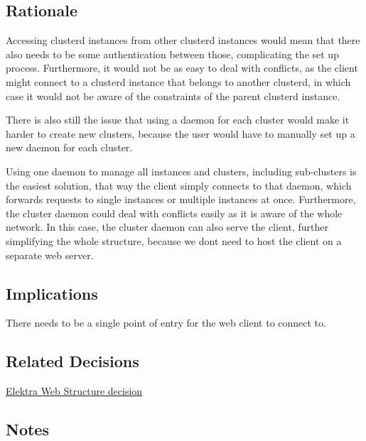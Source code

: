 \subsection*{Rationale}

Accessing clusterd instances from other clusterd instances would mean that there also needs to be some authentication between those, complicating the set up process. Furthermore, it would not be as easy to deal with conflicts, as the client might connect to a clusterd instance that belongs to another clusterd, in which case it would not be aware of the constraints of the parent clusterd instance.

There is also still the issue that using a daemon for each cluster would make it harder to create new clusters, because the user would have to manually set up a new daemon for each cluster.

Using one daemon to manage all instances and clusters, including sub-\/clusters is the easiest solution, that way the client simply connects to that daemon, which forwards requests to single instances or multiple instances at once. Furthermore, the cluster daemon could deal with conflicts easily as it is aware of the whole network. In this case, the cluster daemon can also serve the client, further simplifying the whole structure, because we don\textquotesingle{}t need to host the client on a separate web server.

\subsection*{Implications}


\begin{DoxyItemize}
\item There needs to be a single point of entry for the web client to connect to.
\end{DoxyItemize}

\subsection*{Related Decisions}


\begin{DoxyItemize}
\item \hyperlink{doc_decisions_elektra_web_md}{Elektra Web Structure decision}
\end{DoxyItemize}

\subsection*{Notes}